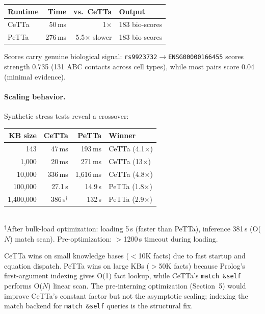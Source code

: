 \documentclass[11pt]{article}
\newcommand{\code}[1]{\texttt{#1}}
\newcommand{\PeTTa}{\textup{PeTTa}}
\newcommand{\CeTTa}{\textup{CeTTa}}
\begin{document}
\begin{center}
\begin{tabular}{lrrl}
\toprule
Runtime & Time & vs.\ \CeTTa{} & Output \\
\midrule
\CeTTa{} & 50\,ms  & 1$\times$        & 183 bio-scores \\
\PeTTa{} & 276\,ms & 5.5$\times$ slower & 183 bio-scores \\
\bottomrule
\end{tabular}
\end{center}

Scores carry genuine biological signal: \code{rs9923732}$\to$\code{ENSG00000166455}
scores strength 0.735 (131 ABC contacts across cell types), while
most pairs score 0.04 (minimal evidence).

\paragraph{Scaling behavior.}
Synthetic stress tests reveal a crossover:

\begin{center}
\begin{tabular}{rrrl}
\toprule
KB size & \CeTTa{} & \PeTTa{} & Winner \\
\midrule
143        & 47\,ms    & 193\,ms   & \CeTTa{} (4.1$\times$) \\
1{,}000    & 20\,ms    & 271\,ms   & \CeTTa{} (13$\times$) \\
10{,}000   & 336\,ms   & 1{,}616\,ms & \CeTTa{} (4.8$\times$) \\
100{,}000  & 27.1\,s   & 14.9\,s   & \PeTTa{} (1.8$\times$) \\
1{,}400{,}000 & 386\,s$^\dagger$ & 132\,s & \PeTTa{} (2.9$\times$) \\
\bottomrule
\end{tabular}
\smallskip\\
{\footnotesize $^\dagger$After bulk-load optimization: loading 5\,s
(faster than \PeTTa{}), inference 381\,s (O($N$) match scan).
Pre-optimization: $>$1200\,s timeout during loading.}
\end{center}

\CeTTa{} wins on small knowledge bases ($<$10K facts) due to fast
startup and equation dispatch.  \PeTTa{} wins on large KBs
($>$50K facts) because Prolog's first-argument indexing gives O(1)
fact lookup, while \CeTTa{}'s \code{match~\&self} performs O($N$)
linear scan.  The pre-interning optimization (Section~5) would
improve \CeTTa{}'s constant factor but not the asymptotic scaling;
indexing the match backend for \code{match~\&self} queries is the
structural fix.
\end{document}
